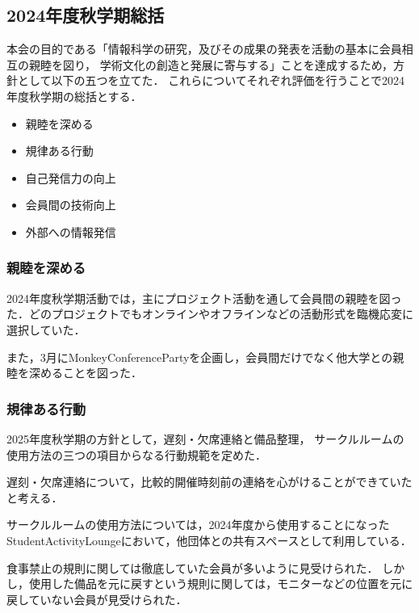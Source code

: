 \subsection*{2024年度秋学期総括}


本会の目的である「情報科学の研究，及びその成果の発表を活動の基本に会員相互の親睦を図り，
学術文化の創造と発展に寄与する」ことを達成するため，方針として以下の五つを立てた．
これらについてそれぞれ評価を行うことで2024年度秋学期の総括とする．

\begin{itemize}
    \item 親睦を深める
    \item 規律ある行動
    \item 自己発信力の向上
    \item 会員間の技術向上
    \item 外部への情報発信
\end{itemize}

\subsubsection*{親睦を深める}
    2024年度秋学期活動では，主にプロジェクト活動を通して会員間の親睦を図った．どのプロジェクトでもオンラインやオフラインなどの活動形式を臨機応変に選択していた．

    また，3月にMonkeyConferencePartyを企画し，会員間だけでなく他大学との親睦を深めることを図った．

\subsubsection*{規律ある行動}
    2025年度秋学期の方針として，遅刻・欠席連絡と備品整理，
    サークルルームの使用方法の三つの項目からなる行動規範を定めた．

    遅刻・欠席連絡について，比較的開催時刻前の連絡を心がけることができていたと考える．

    サークルルームの使用方法については，2024年度から使用することになったStudentActivityLoungeにおいて，他団体との共有スペースとして利用している．

    食事禁止の規則に関しては徹底していた会員が多いように見受けられた．
    しかし，使用した備品を元に戻すという規則に関しては，モニターなどの位置を元に戻していない会員が見受けられた．

